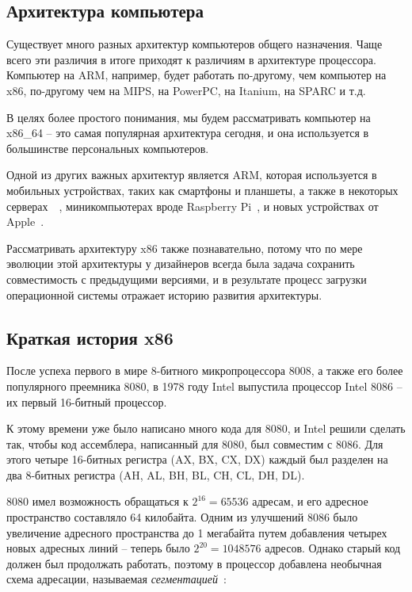 \documentclass[a4page]{article}
\begin{document}
\subsection{Архитектура компьютера}

Существует много разных архитектур компьютеров общего назначения.
Чаще всего эти различия в итоге приходят к различиям в архитектуре процессора.
Компьютер на ARM, например, будет работать по-другому, чем компьютер на x86, 
по-другому чем на MIPS, на PowerPC, на Itanium, на SPARC и т.д.

В целях более простого понимания, мы будем рассматривать компьютер на x86\_64 -- 
это самая популярная архитектура сегодня, и она используется в большинстве
персональных компьютеров.

Одной из других важных архитектур является ARM,
которая используется в мобильных устройствах, таких как смартфоны и планшеты,
а также в некоторых серверах~\cite{web:awsarminst}~\cite{web:awsarmpartners}, миникомпьютерах вроде Raspberry Pi~\cite{web:rpiprocessor},
и новых устройствах от Apple~\cite{enwiki:1114570840}.

Рассматривать архитектуру x86 также познавательно, потому что по мере эволюции
этой архитектуры у дизайнеров всегда была задача сохранить совместимость с
предыдущими версиями, и в результате процесс загрузки операционной системы
отражает историю развития архитектуры.

\subsection{Краткая история x86}

После успеха первого в мире 8-битного микропроцессора 8008,
а также его более популярного преемника 8080,
в 1978 году Intel выпустила процессор Intel 8086 -- их первый 16-битный процессор.

К этому времени уже было написано много кода для 8080,
и Intel решили сделать так, чтобы код ассемблера, написанный для 8080,
был совместим с 8086.
Для этого четыре 16-битных регистра (AX, BX, CX, DX)
каждый был разделен на два 8-битных регистра (AH, AL, BH, BL, CH, CL, DH, DL).

8080 имел возможность обращаться к $2^{16}=65536$ адресам,
и его адресное пространство составляло 64 килобайта.
Одним из улучшений 8086 было увеличение адресного пространства до 1 мегабайта
путем добавления четырех новых адресных линий --
теперь было $2^{20}=1048576$ адресов.
Однако старый код должен был продолжать работать,
поэтому в процессор добавлена необычная схема адресации, называемая \emph{сегментацией}~\cite{enwiki:x86memseg}:
\end{document}
